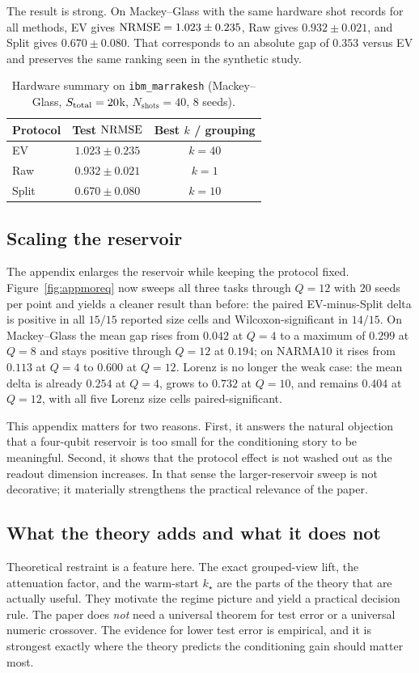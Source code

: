 The result is strong. On Mackey--Glass with the same hardware shot records for all methods, EV gives $\mathrm{NRMSE}=1.023\pm0.235$, Raw gives $0.932\pm0.021$, and Split gives $0.670\pm0.080$. That corresponds to an absolute gap of $0.353$ versus EV and preserves the same ranking seen in the synthetic study.

\begin{table}[!t]
    \caption{Hardware summary on \texttt{ibm\_marrakesh} (Mackey--Glass, $S_{\mathrm{total}}=20$k, $N_{\mathrm{shots}}=40$, 8 seeds).}
    \label{tab:hardware}
    \centering
    \begin{tabular}{lcc}
        \toprule
        Protocol & Test $\mathrm{NRMSE}$ & Best $k$ / grouping \\
        \midrule
        EV & $1.023 \pm 0.235$ & $k=40$ \\
        Raw & $0.932 \pm 0.021$ & $k=1$ \\
        Split & $0.670 \pm 0.080$ & $k=10$ \\
        \bottomrule
    \end{tabular}
\end{table}

\subsection{Scaling the reservoir}

The appendix enlarges the reservoir while keeping the protocol fixed. Figure~\ref{fig:appmoreq} now sweeps all three tasks through $Q=12$ with $20$ seeds per point and yields a cleaner result than before: the paired EV-minus-Split delta is positive in all $15/15$ reported size cells and Wilcoxon-significant in $14/15$. On Mackey--Glass the mean gap rises from $0.042$ at $Q=4$ to a maximum of $0.299$ at $Q=8$ and stays positive through $Q=12$ at $0.194$; on NARMA10 it rises from $0.113$ at $Q=4$ to $0.600$ at $Q=12$. Lorenz is no longer the weak case: the mean delta is already $0.254$ at $Q=4$, grows to $0.732$ at $Q=10$, and remains $0.404$ at $Q=12$, with all five Lorenz size cells paired-significant.

This appendix matters for two reasons. First, it answers the natural objection that a four-qubit reservoir is too small for the conditioning story to be meaningful. Second, it shows that the protocol effect is not washed out as the readout dimension increases. In that sense the larger-reservoir sweep is not decorative; it materially strengthens the practical relevance of the paper.

\subsection{What the theory adds and what it does not}

Theoretical restraint is a feature here. The exact grouped-view lift, the attenuation factor, and the warm-start $k_\star$ are the parts of the theory that are actually useful. They motivate the regime picture and yield a practical decision rule. The paper does \emph{not} need a universal theorem for test error or a universal numeric crossover. The evidence for lower test error is empirical, and it is strongest exactly where the theory predicts the conditioning gain should matter most.
